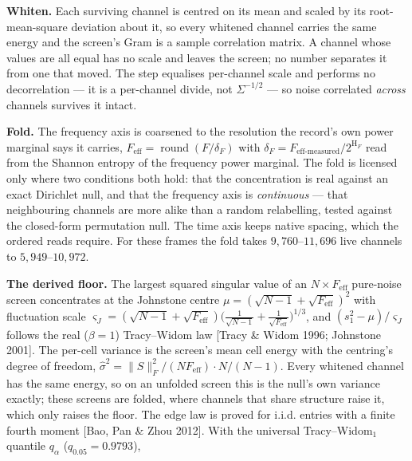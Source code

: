 \documentclass[10pt,letterpaper,twocolumn]{article}
\begin{document}
\textbf{Whiten.} Each surviving channel is centred on its mean and scaled by its root-mean-square deviation about it, so every whitened channel carries the same energy and the screen's Gram is a sample correlation matrix. A channel whose values are all equal has no scale and leaves the screen; no number separates it from one that moved. The step equalises per-channel scale and performs no decorrelation --- it is a per-channel divide, not \(\Sigma^{-1/2}\) --- so noise correlated \emph{across} channels survives it intact.

\textbf{Fold.} The frequency axis is coarsened to the resolution the record's own power marginal says it carries, \(F_{\mathrm{eff}}=\operatorname{round}(F/\delta_F)\) with \(\delta_F=F_{\mathrm{eff}\text{-}\mathrm{measured}}/2^{\mathrm H_F}\) read from the Shannon entropy of the frequency power marginal. The fold is licensed only where two conditions both hold: that the concentration is real against an exact Dirichlet null, and that the frequency axis is \emph{continuous} --- that neighbouring channels are more alike than a random relabelling, tested against the closed-form permutation null. The time axis keeps native spacing, which the ordered reads require. For these frames the fold takes \(9{,}760\)--\(11{,}696\) live channels to \(5{,}949\)--\(10{,}972\).

\textbf{The derived floor.} The largest squared singular value of an \(N\times F_{\mathrm{eff}}\) pure-noise screen concentrates at the Johnstone centre \(\mu=(\sqrt{N-1}+\sqrt{F_{\mathrm{eff}}})^2\) with fluctuation scale \(\varsigma_J=(\sqrt{N-1}+\sqrt{F_{\mathrm{eff}}})\big(\tfrac1{\sqrt{N-1}}+\tfrac1{\sqrt{F_{\mathrm{eff}}}}\big)^{1/3}\), and \((s_1^2-\mu)/\varsigma_J\) follows the real (\(\beta=1\)) Tracy--Widom law {[}Tracy \& Widom 1996; Johnstone 2001{]}. The per-cell variance is the screen's mean cell energy with the centring's degree of freedom, \(\hat\sigma^2=\|S\|_F^2/(N F_{\mathrm{eff}})\cdot N/(N-1)\). Every whitened channel has the same energy, so on an unfolded screen this is the null's own variance exactly; these screens are folded, where channels that share structure raise it, which only raises the floor. The edge law is proved for i.i.d. entries with a finite fourth moment {[}Bao, Pan \& Zhou 2012{]}. With the universal Tracy--Widom\(_1\) quantile \(q_\alpha\) (\(q_{0.05}=0.9793\)),

\end{document}
